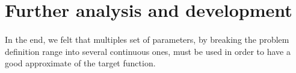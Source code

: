 \documentclass{article}
\begin{document}
   \section{Further analysis and development} %
   \label{sec:section name}
   \paragraph{} %
   \label{par:}
   
     In the end, we felt that multiples set of parameters, by breaking the problem
     definition range into several continuous ones, must be used in order to have
     a good approximate of the target function.

  
\end{document}
